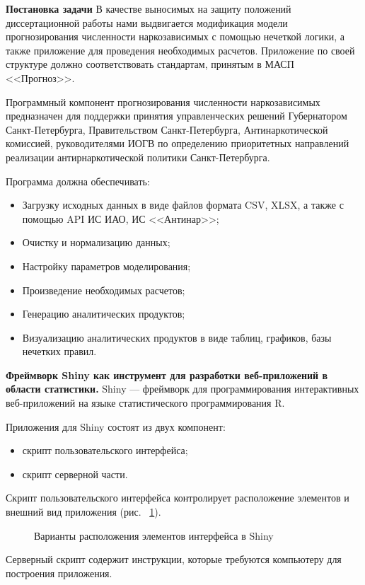 \textbf{Постановка задачи}
В качестве выносимых на защиту положений диссертационной работы нами 
выдвигается модификация модели прогнозирования численности наркозависимых с
помощью нечеткой логики, а также приложение для проведения необходимых расчетов.
Приложение по своей структуре должно соответствовать стандартам, принятым в
МАСП <<Прогноз>>.

Программный компонент прогнозирования численности наркозависимых предназначен
для поддержки принятия управленческих решений Губернатором Санкт-Петербурга,
Правительством Санкт-Петербурга, Антинаркотической комиссией, руководителями
ИОГВ по определению приоритетных направлений реализации антирнаркотической
политики Санкт-Петербурга.

Программа должна обеспечивать:
\begin{itemize}
    \item Загрузку исходных данных в виде файлов формата CSV, XLSX, а также с
        помощью API ИС ИАО, ИС <<Антинар>>;
    \item Очистку и нормализацию данных;
    \item Настройку параметров моделирования;
    \item Произведение необходимых расчетов;
    \item Генерацию аналитических продуктов;
    \item Визуализацию аналитических продуктов в виде таблиц, графиков, базы
        нечетких правил.
\end{itemize}

\textbf{Фреймворк Shiny как инструмент для разработки веб-приложений в области
статистики.}
Shiny --- фреймворк для программирования интерактивных веб-приложений на языке 
статистического программирования R.

Приложения для Shiny состоят из двух компонент:
\begin{itemize}
    \item скрипт пользовательского интерфейса;
    \item скрипт серверной части.
\end{itemize}
Скрипт пользовательского интерфейса контролирует расположение элементов и
внешний вид приложения (рис. ~\ref{figure:layouts}). 

\begin{figure}[bhtp]
    \centering
    \caption{Варианты расположения элементов интерфейса в Shiny}		
    \label{figure:layouts}
\end{figure}
Серверный скрипт содержит инструкции, которые требуются компьютеру для построения 
приложения.

